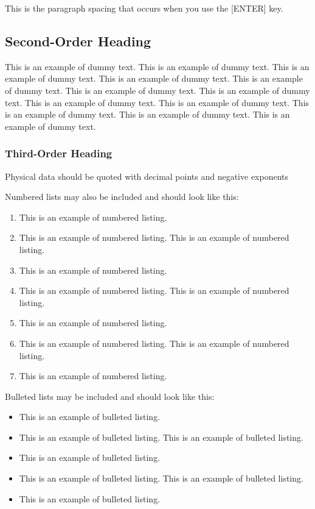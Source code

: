 \documentclass{aip-cp}
\begin{document}
This is the paragraph spacing that occurs when you use the [ENTER] key.

\subsection{Second-Order Heading}
This is an example of dummy text. This is an example of dummy text. This is an example of dummy text.
This is an example of dummy text. This is an example of dummy text. This is an example of dummy text.
This is an example of dummy text. This is an example of dummy text. This is an example of dummy text.
This is an example of dummy text. This is an example of dummy text. This is an example of dummy text.


\subsubsection{Third-Order Heading}
Physical data should be quoted with decimal points and negative exponents 

\noindent Numbered lists may also be included and should look like this:

\begin{enumerate}
\item This is an example of numbered listing.
\item This is an example of numbered listing. This is an example of numbered listing.
\item This is an example of numbered listing.
\item This is an example of numbered listing. This is an example of numbered listing.
\item This is an example of numbered listing.
\item This is an example of numbered listing. This is an example of numbered listing.
\item This is an example of numbered listing.
\end{enumerate}

\noindent Bulleted lists may be included and should look like this:

\begin{itemize}
\item This is an example of bulleted listing.
\item This is an example of bulleted listing. This is an example of bulleted listing.
\item This is an example of bulleted listing.
\item This is an example of bulleted listing. This is an example of bulleted listing.
\item This is an example of bulleted listing.
\end{itemize}
\end{document}
